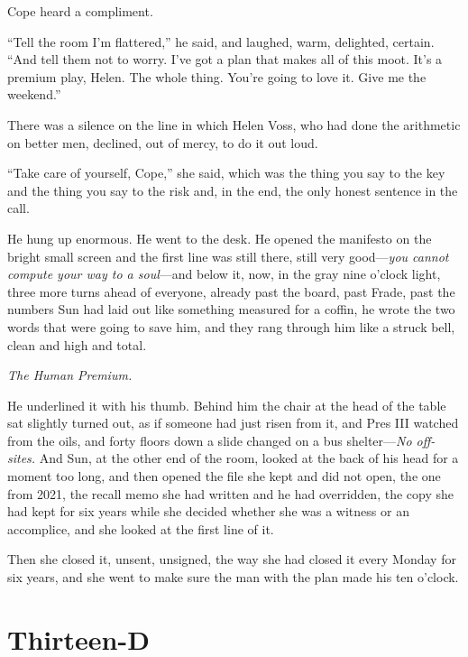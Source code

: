 \documentclass[11pt,openany]{book}
\begin{document}
Cope heard a compliment.

``Tell the room I'm flattered,'' he said, and laughed, warm, delighted, certain. ``And tell them not to worry. I've got a plan that makes all of this moot. It's a premium play, Helen. The whole thing. You're going to love it. Give me the weekend.''

There was a silence on the line in which Helen Voss, who had done the arithmetic on better men, declined, out of mercy, to do it out loud.

``Take care of yourself, Cope,'' she said, which was the thing you say to the key and the thing you say to the risk and, in the end, the only honest sentence in the call.

He hung up enormous. He went to the desk. He opened the manifesto on the bright small screen and the first line was still there, still very good---\textit{you cannot compute your way to a soul}---and below it, now, in the gray nine o'clock light, three more turns ahead of everyone, already past the board, past Frade, past the numbers Sun had laid out like something measured for a coffin, he wrote the two words that were going to save him, and they rang through him like a struck bell, clean and high and total.

\textit{The Human Premium.}

He underlined it with his thumb. Behind him the chair at the head of the table sat slightly turned out, as if someone had just risen from it, and Pres III watched from the oils, and forty floors down a slide changed on a bus shelter---\textit{No off-sites.} And Sun, at the other end of the room, looked at the back of his head for a moment too long, and then opened the file she kept and did not open, the one from 2021, the recall memo she had written and he had overridden, the copy she had kept for six years while she decided whether she was a witness or an accomplice, and she looked at the first line of it.

Then she closed it, unsent, unsigned, the way she had closed it every Monday for six years, and she went to make sure the man with the plan made his ten o'clock.

\clearpage
\chapter{Thirteen-D}
\end{document}
